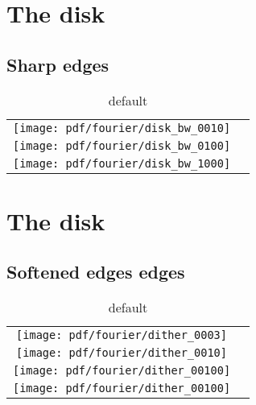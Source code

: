 \section{The disk}

\subsection{Sharp edges}
\begin{table}[htdp]
\begin{center}
\begin{tabular}{cc}

\texttt{[image: pdf/fourier/disk\_bw\_0010]}\\
\texttt{[image: pdf/fourier/disk\_bw\_0100]}\\
\texttt{[image: pdf/fourier/disk\_bw\_1000]}\\

\end{tabular}
\end{center}
\label{tab:fourier:disk}
\caption{default}
\end{table}%
\section{The disk}

\subsection{Softened edges edges}
\begin{table}[htdp]
\begin{center}
\begin{tabular}{cc}

\texttt{[image: pdf/fourier/dither\_0003]}\\
\texttt{[image: pdf/fourier/dither\_0010]}\\
\texttt{[image: pdf/fourier/dither\_00100]}\\
\texttt{[image: pdf/fourier/dither\_00100]}\\

\end{tabular}
\end{center}
\label{tab:fourier:dither}
\caption{default}
\end{table}%

\endinput